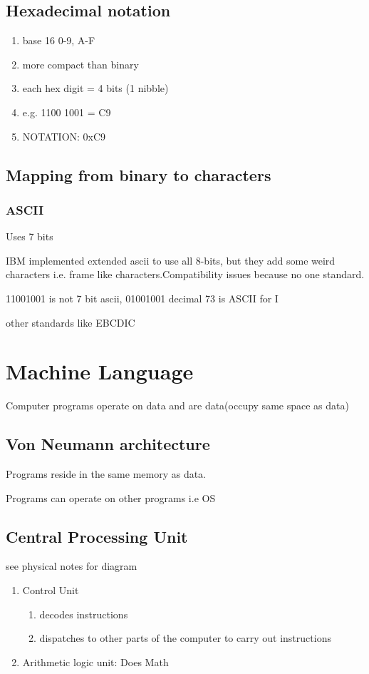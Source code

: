 \documentclass[11pt]{amsart}
\begin{document}
\subsection{Hexadecimal notation}
\begin{enumerate}
  \item base 16 0-9, A-F
  \item more compact than binary
  \item each hex digit = 4 bits (1 nibble)
  \item e.g. 1100 1001  = C9
  \item NOTATION: 0xC9
\end{enumerate}

\subsection{Mapping from binary to characters}
\subsubsection {ASCII}
\par Uses 7 bits
\par IBM implemented extended ascii to use all 8-bits, but they add some weird
characters i.e. frame like characters.Compatibility issues because no one
standard.
\par 11001001 is not 7 bit ascii, 01001001 decimal 73 is ASCII for I
\par other standards like EBCDIC
\section{Machine Language}
\par Computer programs operate on data and are data(occupy same space as data)
\subsection{Von Neumann architecture}
\par Programs reside in the same memory as data.
\par Programs can operate on other programs i.e OS
\subsection{Central Processing Unit}
\par see physical notes for diagram
\begin{enumerate}
  \item Control Unit
    \begin{enumerate}
      \item decodes instructions
      \item dispatches to other parts of the computer to carry out instructions
    \end{enumerate}
  \item Arithmetic logic unit: Does Math
\end{enumerate}
\end{document}

